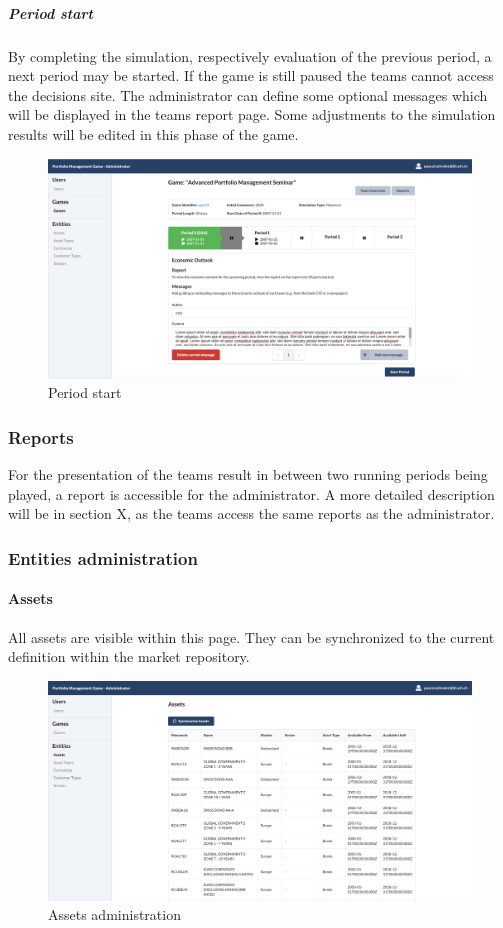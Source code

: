 \subparagraph{Period start}
By completing the simulation, respectively evaluation of the previous period, a next period may be started. If the game is still paused the teams cannot access the decisions site. The administrator can define some optional messages which will be displayed in the teams report page. Some adjustments to the simulation results will be edited in this phase of the game.
\begin{figure}[h!]
  \centering
  \includegraphics[scale=0.2]{img/application-overview/administrator/09_period_start.png}
  \caption{Period start}
\end{figure}

\subsubsection{Reports}
For the presentation of the teams result in between two running periods being played, a report is accessible for the administrator. A more detailed description will be in section X, as the teams access the same reports as the administrator.


\subsubsection{Entities administration}

\paragraph{Assets}
All assets are visible within this page. They can be synchronized to the current definition within the market repository. %
\begin{figure}[h!]
  \centering
  \includegraphics[scale=0.2]{img/application-overview/administrator/entities_assets.png}
  \caption{Assets administration}
\end{figure}


